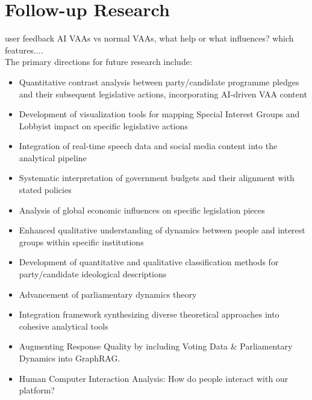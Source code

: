 \documentclass{article}
\begin{document}
\section{Follow-up Research}

user feedback AI VAAs vs normal VAAs, what help or what influences? which features....\\
The primary directions for future research include:
\begin{itemize}
   \item Quantitative contrast analysis between party/candidate programme pledges and their subsequent legislative actions, incorporating AI-driven VAA content
   
   \item Development of visualization tools for mapping Special Interest Groups and Lobbyist impact on specific legislative actions
   
   \item Integration of real-time speech data and social media content into the analytical pipeline
   
   \item Systematic interpretation of government budgets and their alignment with stated policies
   
   \item Analysis of global economic influences on specific legislation pieces
   
   \item Enhanced qualitative understanding of dynamics between people and interest groups within specific institutions
   
   \item Development of quantitative and qualitative classification methods for party/candidate ideological descriptions
   
   \item Advancement of parliamentary dynamics theory
   
   \item Integration framework synthesizing diverse theoretical approaches into cohesive analytical tools

   \item Augmenting Response Quality by including Voting Data \& Parliamentary Dynamics into GraphRAG.
   
    \item Human Computer Interaction Analysis: How do people interact with our platform?
\end{itemize}
\end{document}
